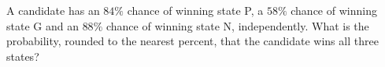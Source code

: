 A candidate has an $84\%$ chance of winning state P, a $58\%$ chance of winning state G and an $88\%$ chance of winning state N, independently. What is the probability, rounded to the nearest percent, that the candidate wins all three states?
